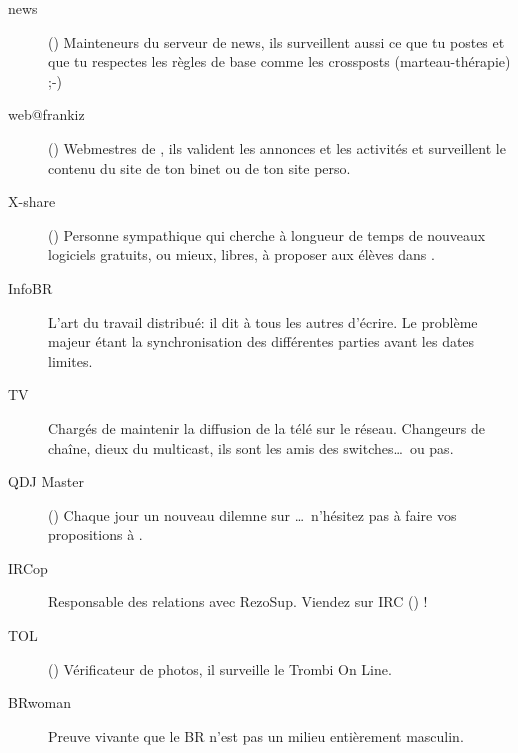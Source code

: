 \begin{description}
  \item[news] {() Mainteneurs du serveur de news, ils surveillent aussi ce que tu postes et que tu respectes les r\`egles de base comme les crossposts (marteau-th\'erapie) \mbox{;-)}}

  \item[web@frankiz] {() Webmestres de \fkz, ils valident les annonces et les activit\'es et surveillent le contenu du site de ton binet ou de ton site perso.}

  \item[X-share] {() Personne sympathique qui cherche \`a longueur de temps de nouveaux logiciels gratuits, ou mieux, libres, \`a proposer aux \'el\`eves dans \xshare.}

  \item[InfoBR]{L'art du travail distribu\'e: il dit \`a tous les autres d'\'ecrire. Le probl\`eme majeur \'etant la synchronisation des diff\'erentes parties avant les dates limites.}

  \item[TV]{Charg\'es de maintenir la diffusion de la t\'el\'e sur le r\'eseau. Changeurs de cha\^ine, dieux du multicast, ils sont les amis des switches\dots\ ou pas.}

  \item[QDJ Master] {() Chaque jour un nouveau dilemne sur \fkz\dots\ n'h\'esitez pas \`a faire vos propositions \`a .}

  \item[IRCop]{Responsable des relations avec RezoSup. Viendez sur IRC () !}

  \item[TOL] {() V\'erificateur de photos, il surveille le Trombi On Line.}

  \item[BRwoman]{Preuve vivante que le BR n'est pas un milieu enti\`erement masculin.}

\end{description}
